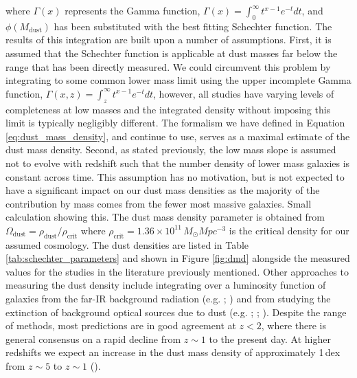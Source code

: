 \noindent where $\Gamma(x)$ represents the Gamma function, $\Gamma(x) = \int_0^\infty t^{x-1}e^{-t} dt$, and $\phi(M_{\textrm{dust}})$ has been substituted with the best fitting Schechter function. The results of this integration are built upon a number of assumptions. First, it is assumed that the Schechter function is applicable at dust masses far below the range that has been directly measured. We could circumvent this problem by integrating to some common lower mass limit using the upper incomplete Gamma function, $\Gamma(x, z) = \int_z^\infty t^{x-1}e^{-t} dt$, however, all studies have varying levels of completeness at low masses and the integrated density without imposing this limit is typically negligibly different. The formalism we have defined in Equation \ref{eq:dust_mass_density}, and continue to use, serves as a maximal estimate of the dust mass density. Second, as stated previously, the low mass slope is assumed not to evolve with redshift such that the number density of lower mass galaxies is constant across time. This assumption has no motivation, but is not expected to have a significant impact on our dust mass densities as the majority of the contribution by mass comes from the fewer most massive galaxies. {\color{red}Small calculation showing this.} The dust mass density parameter is obtained from $\Omega_{\textrm{dust}} = \rho_{\textrm{dust}}/\rho_{\textrm{crit}}$ where $\rho_{\textrm{crit}} = 1.36\times10^{11}\,M_{\odot}Mpc^{-3}$ is the critical density for our assumed cosmology. The dust densities are listed in Table \ref{tab:schechter_parameters} and shown in Figure \ref{fig:dmd} alongside the measured values for the studies in the literature previously mentioned. Other approaches to measuring the dust density include integrating over a luminosity function of galaxies from the far-IR background radiation (e.g. \citealt{deBernadis_2012}; \citealt{Thacker_2013}) and from studying the extinction of background optical sources due to dust (e.g. \citealt{Driver_2007}; \citealt{Fukugita_2011}; \citealt{Menard_2012}). Despite the range of methods, most predictions are in good agreement at $z < 2$, where there is general consensus on a rapid decline from $z \sim 1$ to the present day. At higher redshifts we expect an increase in the dust mass density of approximately 1\,dex from $z \sim 5$ to $z \sim 1$ (\citealt{Peroux_2020}).

